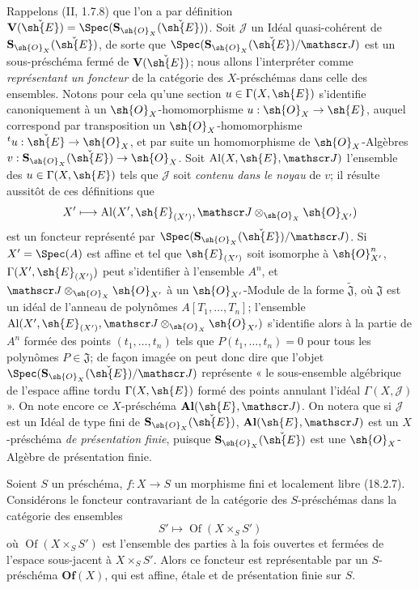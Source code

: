 \begin{env}[18.5.2]
\label{IV.18.5.2}
Rappelons (II, 1.7.8) que l'on a par définition $\mathbf V(\check{\sh{E}})=\Spec(\mathbf S_{\sh{O}_X}(\check{\sh{E}}))$. Soit $\mathscr J$ un Idéal quasi-cohérent de $\mathbf S_{\sh{O}_X}(\check{\sh{E}})$, de sorte que $\Spec(\mathbf S_{\sh{O}_X}(\check{\sh{E}})/\mathscr J)$ est un sous-préschéma fermé de $\mathbf V(\check{\sh{E}})$; nous allons l'interpréter comme \emph{représentant un foncteur} de la catégorie des $X$-préschémas dans celle des ensembles. Notons pour cela qu'une section $u\in\Gamma(X,\sh{E})$ s'identifie canoniquement à un $\sh{O}_X$-homomorphisme $u:\sh{O}_X\to\sh{E}$, auquel correspond par transposition un $\sh{O}_X$-homomorphisme ${}^t u:\check{\sh{E}}\to\sh{O}_X$, et par suite un homomorphisme de $\sh{O}_X$-Algèbres $v:\mathbf S_{\sh{O}_X}(\check{\sh{E}})\to\sh{O}_X$. Soit $\operatorname{Al}(X,\sh{E},\mathscr J)$ l'ensemble des $u\in\Gamma(X,\sh{E})$ tels que $\mathscr J$ soit \emph{contenu dans le noyau} de $v$; il résulte aussitôt de ces définitions que
\[
  X'\longmapsto\operatorname{Al}(X',\sh{E}_{(X')},\mathscr J\otimes_{\sh{O}_X}\sh{O}_{X'})
\]
est un foncteur représenté par $\Spec(\mathbf S_{\sh{O}_X}(\check{\sh{E}})/\mathscr J)$. Si $X'=\Spec(A)$ est affine et tel que $\sh{E}_{(X')}$ soit isomorphe à $\sh{O}_{X'}^n$, $\Gamma(X',\sh{E}_{(X')})$ peut s'identifier à l'ensemble $A^n$, et $\mathscr J\otimes_{\sh{O}_X}\sh{O}_{X'}$ à un $\sh{O}_{X'}$-Module de la forme $\widetilde{\mathfrak J}$, où $\mathfrak J$ est un idéal de l'anneau de polynômes $A[T_1,\ldots,T_n]$; l'ensemble $\operatorname{Al}(X',\sh{E}_{(X')},\mathscr J\otimes_{\sh{O}_X}\sh{O}_{X'})$ s'identifie alors à la partie de $A^n$ formée des points $(t_1,\ldots,t_n)$ tels que $P(t_1,\ldots,t_n)=0$ pour tous les polynômes $P\in\mathfrak J$; de façon imagée on peut donc dire que l'objet $\Spec(\mathbf S_{\sh{O}_X}(\check{\sh{E}})/\mathscr J)$ représente « le sous-ensemble algébrique de l'espace affine tordu $\Gamma(X,\sh{E})$ formé des points annulant l'idéal $\Gamma(X,\mathscr J)$ ». On note encore ce $X$-préschéma $\mathbf{Al}(\sh{E},\mathscr J)$. On notera que si $\mathscr J$ est un Idéal de type fini de $\mathbf S_{\sh{O}_X}(\check{\sh{E}})$, $\mathbf{Al}(\sh{E},\mathscr J)$ est un $X$-préschéma \emph{de présentation finie}, puisque $\mathbf S_{\sh{O}_X}(\check{\sh{E}})$ est une $\sh{O}_X$-Algèbre de présentation finie.
\end{env}

\begin{lemma}[18.5.3]
\label{IV.18.5.3}
Soient $S$ un préschéma, $f:X\to S$ un morphisme fini et localement libre (18.2.7). Considérons le foncteur contravariant de la catégorie des $S$-préschémas dans la catégorie des ensembles
\begin{equation}
  S'\longmapsto\operatorname{Of}(X\times_S S')
  \tag{18.5.3.1}\label{IV.18.5.3.1}
\end{equation}
où $\operatorname{Of}(X\times_S S')$ est l'ensemble des parties à la fois ouvertes et fermées de l'espace sous-jacent à $X\times_S S'$. Alors ce foncteur est représentable par un $S$-préschéma $\mathbf{Of}(X)$, qui est affine, étale et de présentation finie sur $S$.
\end{lemma}

